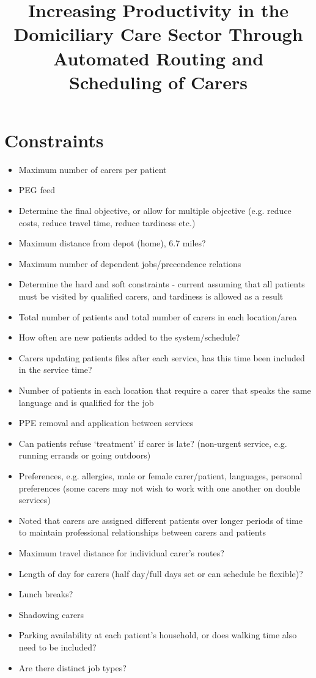 \documentclass[a4paper]{article}
\begin{document}
\title{Increasing Productivity in the Domiciliary Care Sector Through Automated Routing and Scheduling of Carers}
\date{}
\maketitle

\section{Constraints}
\begin{itemize}[leftmargin=*, itemsep=-0.1em]
	\item Maximum number of carers per patient
	\item PEG feed
	\item Determine the final objective, or allow for multiple objective (e.g. reduce costs, reduce travel time, reduce tardiness etc.)
	\item Maximum distance from depot (home), 6.7 miles?
	\item Maximum number of dependent jobs/precendence relations
	\item Determine the hard and soft constraints - current assuming that all patients must be visited by qualified carers, and tardiness is allowed as a result
	\item Total number of patients and total number of carers in each location/area
	\item How often are new patients added to the system/schedule?
	\item Carers updating patients files after each service, has this time been included in the service time?
	\item Number of patients in each location that require a carer that speaks the same language and is qualified for the job
	\item PPE removal and application between services
	\item Can patients refuse `treatment' if carer is late? (non-urgent service, e.g. running errands or going outdoors)
	\item Preferences, e.g. allergies, male or female carer/patient, languages, personal preferences (some carers may not wish to work with one another on double services) 
	\item Noted that carers are assigned different patients over longer periods of time to maintain professional relationships between carers and patients
	\item Maximum travel distance for individual carer's routes?
	\item Length of day for carers (half day/full days set or can schedule be flexible)?
	\item Lunch breaks?
	\item Shadowing carers
	\item Parking availability at each patient's household, or does walking time also need to be included?
	\item Are there distinct job types?
\end{itemize}
\end{document}

